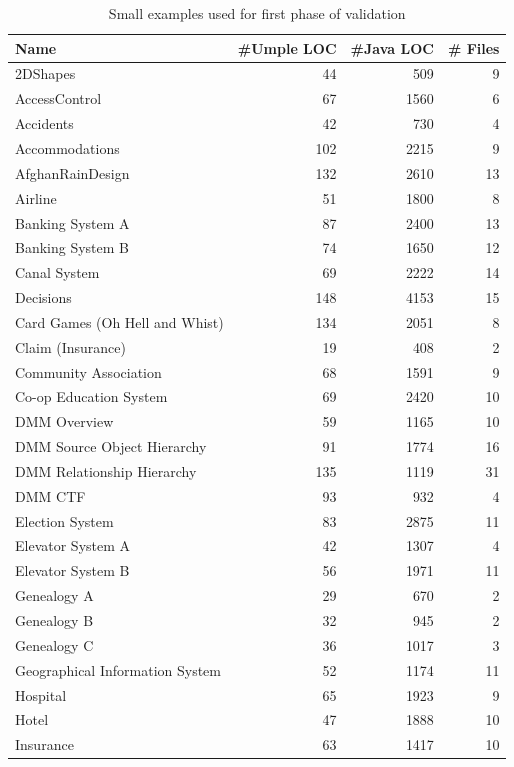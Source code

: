\begin{table}
\caption{Small examples used for first phase of validation}
\label{table:umpleexamples}
\centering
\begin{tabular}{p{6cm}|rrr}
\toprule
\rowcolor[HTML]{BBDAFF}
\textbf{Name} & \textbf{\#Umple LOC} & \textbf{\#Java LOC} & \textbf{\#  Files} \\ \midrule
2DShapes & 44 & 509 & 9\\ \hline
AccessControl & 67 & 1560 & 6\\ \hline
Accidents & 42 & 730 & 4\\ \hline
Accommodations & 102 & 2215 & 9\\ \hline
AfghanRainDesign & 132 & 2610 & 13\\ \hline
Airline & 51 & 1800 & 8\\ \hline
Banking System A & 87 & 2400 & 13\\ \hline
Banking System B & 74 & 1650 & 12\\ \hline
Canal System & 69 & 2222 & 14\\ \hline
Decisions & 148 & 4153 & 15\\ \hline
Card Games (Oh Hell and Whist) & 134 & 2051 & 8\\ \hline
Claim (Insurance) & 19 & 408 & 2\\ \hline
Community Association & 68 & 1591 & 9\\ \hline
Co-op Education System & 69 & 2420 & 10\\ \hline
DMM Overview & 59 & 1165 & 10\\ \hline
DMM Source Object Hierarchy & 91 & 1774 & 16\\ \hline
DMM Relationship Hierarchy & 135 & 1119 & 31\\ \hline
DMM CTF & 93 & 932 & 4\\ \hline
Election System & 83 & 2875 & 11\\ \hline
Elevator System A & 42 & 1307 & 4\\ \hline
Elevator System B & 56 & 1971 &11\\ \hline
Genealogy A & 29 & 670 & 2\\ \hline
Genealogy B & 32 & 945 & 2\\ \hline
Genealogy C & 36 & 1017 & 3\\ \hline
Geographical Information System & 52 & 1174 & 11\\ \hline
Hospital & 65 & 1923 & 9\\ \hline
Hotel & 47 & 1888 & 10\\ \hline
Insurance & 63 & 1417 & 10\\ \hline

\end{tabular}
\end{table}
